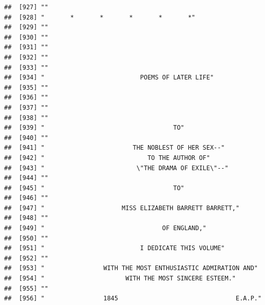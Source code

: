 \documentclass{article}\usepackage[]{graphicx}\usepackage[]{color}
\makeatletter
\newenvironment{kframe}{%
 \def\at@end@of@kframe{}%
 \ifinner\ifhmode%
  \def\at@end@of@kframe{\end{minipage}}%
  \begin{minipage}{\columnwidth}%
 \fi\fi%
 \def\FrameCommand##1{\hskip\@totalleftmargin \hskip-\fboxsep
 \colorbox{shadecolor}{##1}\hskip-\fboxsep
     \hskip-\linewidth \hskip-\@totalleftmargin \hskip\columnwidth}%
 \MakeFramed {\advance\hsize-\width
   \@totalleftmargin\z@ \linewidth\hsize
   \@setminipage}}%
 {\par\unskip\endMakeFramed%
 \at@end@of@kframe}
\newenvironment{knitrout}{}{} %
\makeatother
\begin{document}
\begin{knitrout}
\begin{kframe}
\begin{verbatim}
##  [927] ""                                                                            
##  [928] "       *       *       *       *       *"                                    
##  [929] ""                                                                            
##  [930] ""                                                                            
##  [931] ""                                                                            
##  [932] ""                                                                            
##  [933] ""                                                                            
##  [934] "                          POEMS OF LATER LIFE"                               
##  [935] ""                                                                            
##  [936] ""                                                                            
##  [937] ""                                                                            
##  [938] ""                                                                            
##  [939] "                                   TO"                                       
##  [940] ""                                                                            
##  [941] "                        THE NOBLEST OF HER SEX--"                            
##  [942] "                            TO THE AUTHOR OF"                                
##  [943] "                         \"THE DRAMA OF EXILE\"--"                           
##  [944] ""                                                                            
##  [945] "                                   TO"                                       
##  [946] ""                                                                            
##  [947] "                     MISS ELIZABETH BARRETT BARRETT,"                        
##  [948] ""                                                                            
##  [949] "                                OF ENGLAND,"                                 
##  [950] ""                                                                            
##  [951] "                          I DEDICATE THIS VOLUME"                            
##  [952] ""                                                                            
##  [953] "                WITH THE MOST ENTHUSIASTIC ADMIRATION AND"                   
##  [954] "                      WITH THE MOST SINCERE ESTEEM."                         
##  [955] ""                                                                            
##  [956] "                1845                                E.A.P."                  

\end{verbatim}
\end{kframe}
\end{knitrout}
\end{document}

